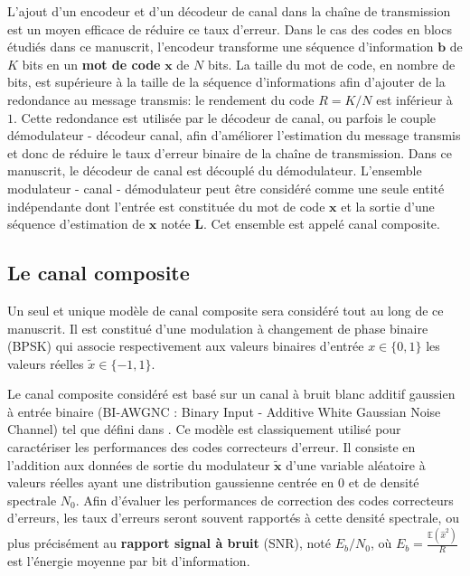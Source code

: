 L'ajout d'un encodeur et d'un décodeur de canal dans la chaîne de transmission est un moyen efficace de réduire ce taux d'erreur. Dans le cas des codes en blocs étudiés dans ce manuscrit, l'encodeur transforme une séquence d'information $\mathbold{b}$ de $K$ bits en un \textbf{mot de code} $\mathbold{x}$ de $N$ bits. La taille du mot de code, en nombre de bits, est supérieure à la taille de la séquence d'informations afin d'ajouter de la redondance au message transmis: le rendement du code $R=K/N$ est inférieur à $1$. Cette redondance est utilisée par le décodeur de canal, ou parfois le couple démodulateur - décodeur canal, afin d'améliorer l'estimation du message transmis et donc de réduire le taux d'erreur binaire de la chaîne de transmission. Dans ce manuscrit, le décodeur de canal est découplé du démodulateur. L'ensemble modulateur - canal - démodulateur peut être considéré comme une seule entité indépendante dont l'entrée est constituée du mot de code $\mathbold{x}$ et la sortie d'une séquence d'estimation de $\mathbold{x}$ notée $\mathbold{L}$. Cet ensemble est appelé canal composite.

\subsection{Le canal composite}
\label{subsec:canal}

Un seul et unique modèle de canal composite sera considéré tout au long de ce manuscrit. Il est constitué d'une modulation à changement de phase binaire (BPSK) qui associe respectivement aux valeurs binaires d'entrée $x\in\{0,1\}$ les valeurs réelles $\tilde{x}\in\{-1,1\}$.

Le canal composite considéré est basé sur un canal à bruit blanc additif gaussien à entrée binaire (BI-AWGNC : Binary Input - Additive White Gaussian Noise Channel) tel que défini dans \cite[Section~1.5.1.3]{ryan2009channel}. Ce modèle est classiquement utilisé pour caractériser les performances des codes correcteurs d'erreur. Il consiste en l'addition aux données de sortie du modulateur $\mathbold{\tilde{x}}$ d'une variable aléatoire à valeurs réelles ayant une distribution gaussienne centrée en $0$ et de densité spectrale $N_0$. Afin d'évaluer les performances de correction des codes correcteurs d'erreurs, les taux d'erreurs seront souvent rapportés à cette densité spectrale, ou plus précisément au \textbf{rapport signal à bruit} (SNR), noté $E_b/N_0$, où $E_b=\frac{\mathbb{E}(\hat{x}^2)}{R}$ est l'énergie moyenne par bit d'information.

